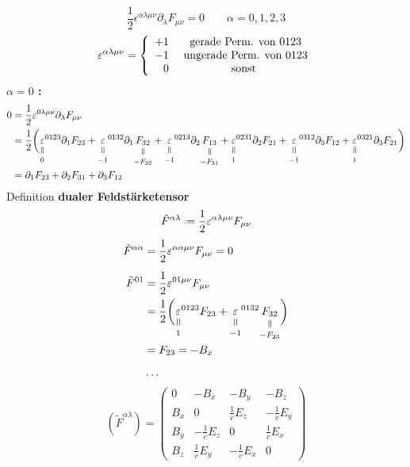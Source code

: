 \begin{equation*}
\frac{1}{2} \epsilon^{\alpha \lambda \mu \nu} \partial_{\lambda} F_{\mu \nu} = 0 \qquad \alpha = 0, 1, 2, 3
\end{equation*}
\begin{equation*}
\varepsilon^{\alpha \lambda \mu \nu} = \left\{ \begin{array}{r c}
+1 & \textrm{ gerade Perm. von } 0123\\
-1 & \textrm{ ungerade Perm. von } 0123\\
0 & \textrm{ sonst }
\end{array} \right.
\end{equation*}
\textbf{$ \alpha = 0 $ :}
\begin{align*}
0 &= \frac{1}{2} \epsilon^{0 \lambda \mu \nu} \partial_{\lambda} F_{\mu \nu}\\
&= \frac{1}{2} \bigg(\equalto{\epsilon}{0}^{0123} \partial_1 F_{23} + \equalto{\epsilon}{-1}^{0132} \partial_{1} \equalto{F_{32}}{- F_{32}} + \equalto{\epsilon}{-1}^{0213} \partial_{2} \equalto{F_{13}}{- F_{31}} + \equalto{\epsilon}{1}^{0231} \partial_{2} F_{21} + \equalto{\epsilon}{-1}^{0312} \partial_{3} F_{12} + \equalto{\epsilon}{1}^{0321} \partial_{3} F_{21} \bigg)\\
&= \partial_1 F_{23} + \partial_2 F_{31} + \partial_3 F_{12}
\end{align*}
Definition \textbf{dualer Feldstärketensor}
\begin{equation*}
\tilde{F}^{\alpha \lambda} \defeq \frac{1}{2} \epsilon^{\alpha \lambda \mu \nu} F_{\mu \nu}
\end{equation*}
\noindent
\begin{align*}
\tilde{F}^{\alpha \alpha} &= \frac{1}{2} \epsilon^{\alpha \alpha \mu \nu} F_{\mu \nu} = 0\\[5pt]
\tilde{F}^{0 1} &= \frac{1}{2} \epsilon^{0 1 \mu \nu} F_{\mu \nu} \\
&= \frac{1}{2} \bigg( \equalto{\epsilon}{1}^{0123} F_{23} + \equalto{\epsilon}{-1}^{0132} \equalto{F_{32}}{- F_{23}} \bigg)\\
&= F_{23} = - B_x\\[5pt]
& \dots
\end{align*}
\begin{equation*}
(\tilde{F}^{\alpha \lambda}) = \begin{pmatrix}
0 & -B_x & - B_y & - B_z \\[10pt]
B_x & 0 & \frac{1}{c} E_z & -\frac{1}{c} E_y \\[10pt]
B_y & - \frac{1}{c} E_z & 0 & \frac{1}{c} E_x \\[10pt]
B_z & \frac{1}{c} E_y & - \frac{1}{c} E_x & 0
\end{pmatrix}
\end{equation*}
